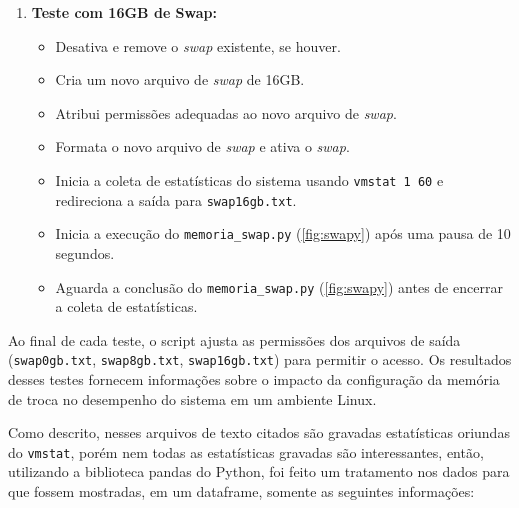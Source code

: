 \documentclass[
	12pt,				%
	openright,			%
	oneside,			%
	a4paper,			%
	chapter=TITLE,		%
	english,			%
	french,				%
	spanish,			%
	brazil				%
	]{abntex2}
\theoremstyle{definition}
\begin{document}
\begin{enumerate}[label=\arabic*.]
    \item \textbf{Teste com 16GB de Swap:}
    \begin{itemize}
        \item Desativa e remove o \textit{swap} existente, se houver.
        \item Cria um novo arquivo de \textit{swap} de 16GB.
        \item Atribui permissões adequadas ao novo arquivo de \textit{swap}.
        \item Formata o novo arquivo de \textit{swap} e ativa o \textit{swap}.
        \item Inicia a coleta de estatísticas do sistema usando \texttt{vmstat 1 60} e redireciona a saída para \texttt{swap16gb.txt}.
        \item Inicia a execução do \texttt{memoria\_swap.py} (\ref{fig:swapy}) após uma pausa de 10 segundos.
        \item Aguarda a conclusão do \texttt{memoria\_swap.py} (\ref{fig:swapy}) antes de encerrar a coleta de estatísticas.
    \end{itemize}
\end{enumerate}

Ao final de cada teste, o script ajusta as permissões dos arquivos de saída (\texttt{swap0gb.txt}, 
\texttt{swap8gb.txt}, \texttt{swap16gb.txt}) para permitir o acesso. Os resultados desses testes 
fornecem informações sobre o impacto da configuração da memória de troca no desempenho do sistema 
em um ambiente Linux.

Como descrito, nesses arquivos de texto citados são gravadas estatísticas oriundas do \texttt{vmstat}, porém nem todas 
as estatísticas gravadas são interessantes, então, utilizando a biblioteca pandas do Python, foi feito um tratamento 
nos dados para que fossem mostradas, em um dataframe, somente as seguintes informações:
\end{document}
